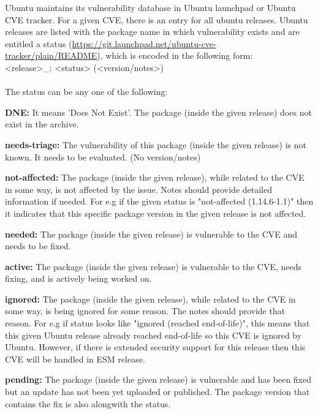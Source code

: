 \documentclass[a4paper,num-refs]{oup-contemporary}
\begin{document}
Ubuntu maintains its vulnerability database in Ubuntu launchpad or Ubuntu CVE tracker. For a given CVE, there is an entry for all ubuntu releases.
Ubuntu releases are listed with the package name
in which vulnerability exists and are entitled a status
(\href{https://git.launchpad.net/ubuntu-cve-tracker/plain/README}{https://git.launchpad.net/ubuntu-cve-tracker/plain/README}), which is
encoded in the following form:
\newline \\
\noindent <release>\_<source-package>: <status> (<version/notes>) \\
\newline\\
The status can be any one of the following:

\textbf{DNE:} It means 'Does Not Exist'. The package (inside the given release) does not exist in the
		archive.

\textbf{needs-triage:} The vulnerability of this package (inside the given release)
		is not known. It needs to be evaluated.  (No version/notes)

\textbf{not-affected:} The package (inside the given release), while related to the
		CVE in some way, is not affected by the issue. Notes should
		provide detailed information if needed. For e.g if the given
		status is "not-affected (1.14.6-1.1)" then it indicates that this specific
		package version in the given release is not affected.

\textbf{needed:} The package (inside the given release) is vulnerable to the
		CVE and needs to be fixed.

\textbf{active:} The package (inside the given release) is vulnerable to the
		CVE, needs fixing, and is actively being worked on.

\textbf{ignored:} The package (inside the given release), while related to the
		CVE in some way, is being ignored for some reason.  The
		notes should provide that reason. For e.g if status looks  like
		"ignored (reached end-of-life)", this means that this given Ubuntu release already reached
		end-of-life so this CVE is ignored by Ubuntu. However, if there
		is extended security support for this release then this
		CVE will be handled in ESM release.

\textbf{pending:} The package (inside the given release) is vulnerable and
                  has been fixed but an update has not been yet uploaded or
		  published. The package version that contains the fix is also
		  alongwith the status.
\end{document}
